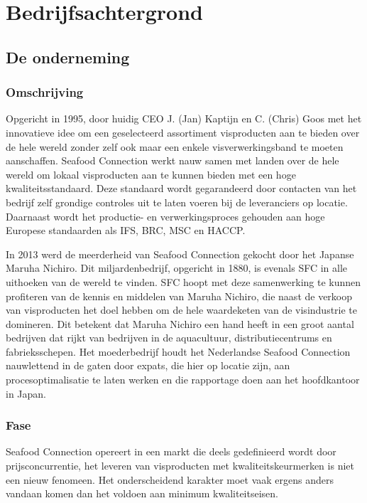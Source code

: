 \documentclass[10pt,a4paper,twoside]{report}
\begin{document}
\chapter{Bedrijfsachtergrond}
\section{De onderneming}
\subsection{Omschrijving}
Opgericht in 1995, door huidig CEO J. (Jan) Kaptijn en C. (Chris) Goos met het innovatieve idee om een geselecteerd assortiment visproducten aan te bieden over de hele wereld zonder zelf ook maar een enkele visverwerkingsband te moeten aanschaffen. Seafood Connection werkt nauw samen met landen over de hele wereld om lokaal visproducten aan te kunnen bieden met een hoge kwaliteitsstandaard. Deze standaard wordt gegarandeerd door contacten van het bedrijf zelf grondige controles uit te laten voeren bij de leveranciers op locatie. Daarnaast wordt het productie- en verwerkingsproces gehouden aan hoge Europese standaarden als IFS, BRC, MSC en HACCP. \citep{sfcwebsite}

In 2013 werd de meerderheid van Seafood Connection gekocht door het Japanse Maruha Nichiro. Dit miljardenbedrijf, opgericht in 1880, is evenals SFC in alle uithoeken van de wereld te vinden. SFC hoopt met deze samenwerking te kunnen profiteren van de kennis en middelen van Maruha Nichiro, die naast de verkoop van visproducten het doel hebben om de hele waardeketen van de visindustrie te domineren. Dit betekent dat Maruha Nichiro een hand heeft in een groot aantal bedrijven dat rijkt van bedrijven in de aquacultuur, distributiecentrums en fabrieksschepen. Het moederbedrijf houdt het Nederlandse Seafood Connection nauwlettend in de gaten door expats, die hier op locatie zijn, aan procesoptimalisatie te laten werken en die rapportage doen aan het hoofdkantoor in Japan. \citep{sfcwebsite,Visserijnieuws}

\subsection{Fase}
Seafood Connection opereert in een markt die deels gedefinieerd wordt door prijsconcurrentie, het leveren van visproducten met kwaliteitskeurmerken is niet een nieuw fenomeen. Het onderscheidend karakter moet vaak ergens anders vandaan komen dan het voldoen aan minimum kwaliteitseisen. 
\end{document}
